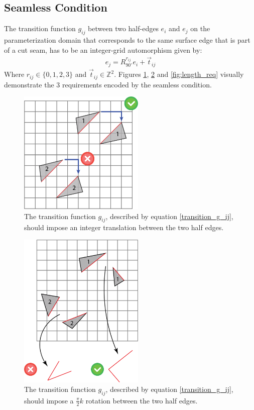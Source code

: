 \subsection{Seamless Condition}
\label{section:seamless_cond}
The transition function $g_{ij}$ between two half-edges $e_i$ and $e_j$ on the parameterization domain that corresponds to the same surface edge that is part of a cut seam, has to be an integer-grid automorphism given by:
\begin{equation}\label{transition_g_ij}
\begin{split}
e_j = R^{r_{ij}}_{90^\circ}e_i + \vec{t}_{ij}
\end{split}
\end{equation}
Where  $r_{ij} \in \{0,1,2,3\}$ and $\vec{t}_{ij} \in \mathbb{Z}^2$. Figures \ref{fig:translation_req}, \ref{fig:angle_req} and \ref{fig:length_req} visually demonstrate the 3 requirements encoded by the seamless condition.
\begin{figure}[ht]
\centering
\includegraphics[width=6cm]{figures/seamless/translation.png}
\caption[The Translation Requirement]{The transition function $g_{ij}$, described by equation \ref{transition_g_ij}, should impose an integer translation between the two half edges.}
\label{fig:translation_req}
\end{figure}
\begin{figure}[ht]
\centering
\includegraphics[width=6cm]{figures/seamless/angle.png}
\caption[The Angle Requirement]{The transition function $g_{ij}$, described by equation \ref{transition_g_ij}, should impose a $\frac{\pi}{2}k$ rotation between the two half edges.}
\label{fig:angle_req}
\end{figure}
